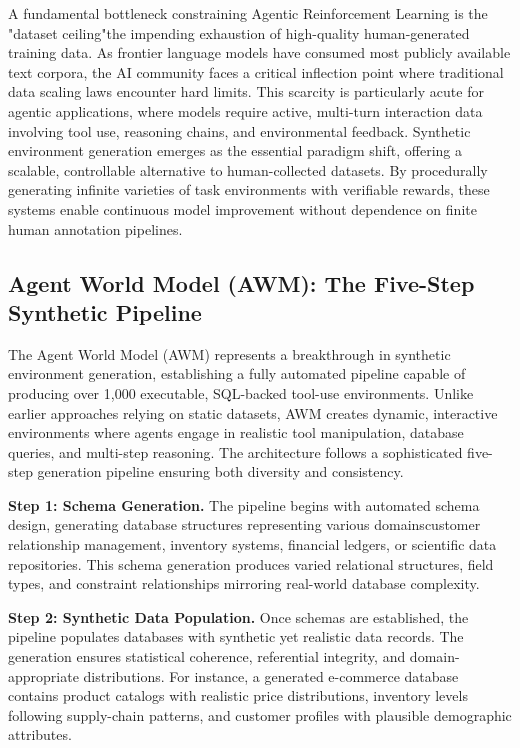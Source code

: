 A fundamental bottleneck constraining Agentic Reinforcement Learning is the "dataset ceiling"the impending exhaustion of high-quality human-generated training data. As frontier language models have consumed most publicly available text corpora, the AI community faces a critical inflection point where traditional data scaling laws encounter hard limits. This scarcity is particularly acute for agentic applications, where models require active, multi-turn interaction data involving tool use, reasoning chains, and environmental feedback. Synthetic environment generation emerges as the essential paradigm shift, offering a scalable, controllable alternative to human-collected datasets. By procedurally generating infinite varieties of task environments with verifiable rewards, these systems enable continuous model improvement without dependence on finite human annotation pipelines.

\subsection{Agent World Model (AWM): The Five-Step Synthetic Pipeline}

The Agent World Model (AWM) represents a breakthrough in synthetic environment generation, establishing a fully automated pipeline capable of producing over 1,000 executable, SQL-backed tool-use environments. Unlike earlier approaches relying on static datasets, AWM creates dynamic, interactive environments where agents engage in realistic tool manipulation, database queries, and multi-step reasoning. The architecture follows a sophisticated five-step generation pipeline ensuring both diversity and consistency.

\textbf{Step 1: Schema Generation.} The pipeline begins with automated schema design, generating database structures representing various domainscustomer relationship management, inventory systems, financial ledgers, or scientific data repositories. This schema generation produces varied relational structures, field types, and constraint relationships mirroring real-world database complexity.

\textbf{Step 2: Synthetic Data Population.} Once schemas are established, the pipeline populates databases with synthetic yet realistic data records. The generation ensures statistical coherence, referential integrity, and domain-appropriate distributions. For instance, a generated e-commerce database contains product catalogs with realistic price distributions, inventory levels following supply-chain patterns, and customer profiles with plausible demographic attributes.

